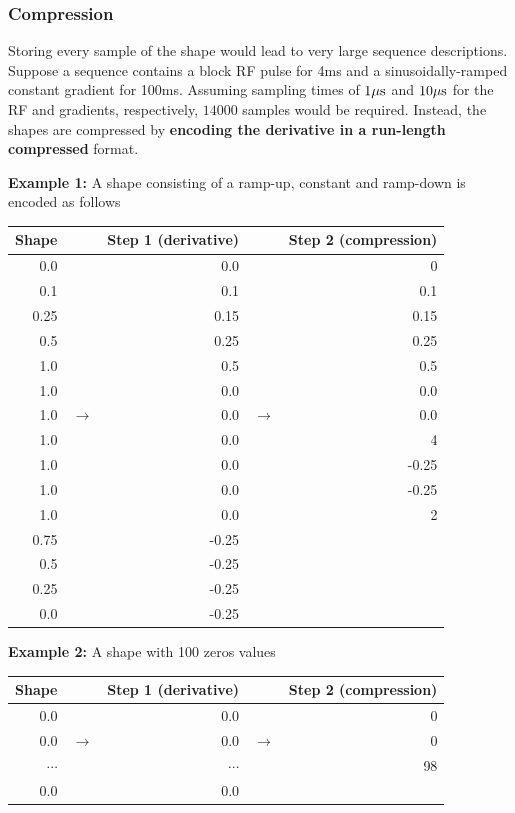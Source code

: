\documentclass{article}
\begin{document}
\subsubsection{Compression}

Storing every sample of the shape would lead to very large sequence descriptions. Suppose a sequence contains a block RF pulse for 4ms and a sinusoidally-ramped constant gradient for 100ms. Assuming sampling times of $1{\rm \mu s}$ and $10{\rm \mu s}$ for the RF and gradients, respectively, $14000$ samples would be required. Instead, the shapes are compressed by \textbf{encoding the derivative in a run-length compressed} format. 

\textbf{Example 1: } A shape consisting of a ramp-up, constant and ramp-down is encoded as follows
\vspace{-1em}
\begin{center}
\begin{tabular}{rrrrr}
\toprule
Shape & & Step 1 (derivative) && Step 2 (compression) \\
\midrule
0.0 && 0.0 && 0 \\
0.1 && 0.1 && 0.1 \\
0.25&& 0.15&& 0.15 \\
0.5 && 0.25&& 0.25 \\
1.0 && 0.5 && 0.5 \\
1.0 && 0.0 && 0.0 \\
1.0 & $\rightarrow$& 0.0 & $\rightarrow$ & 0.0 \\
1.0 && 0.0 && 4 \\
1.0 && 0.0 && -0.25 \\
1.0 && 0.0 && -0.25 \\
1.0 && 0.0 && 2 \\
0.75&& -0.25 \\
0.5 && -0.25 \\
0.25&& -0.25 \\
0.0 && -0.25 \\
\bottomrule
\end{tabular}
\end{center}

\textbf{Example 2: } A shape with 100 zeros values
\vspace{-1em}
\begin{center}
\begin{tabular}{rrrrr}
\toprule
Shape & & Step 1 (derivative) && Step 2 (compression) \\
\midrule
0.0 && 0.0 && 0 \\
0.0 & $\rightarrow$ & 0.0 & $\rightarrow$ & 0 \\
$\cdots$ &  & $\cdots$ &  & 98 \\
0.0 && 0.0 &&  \\
\bottomrule
\end{tabular}
\end{center}
\end{document}
